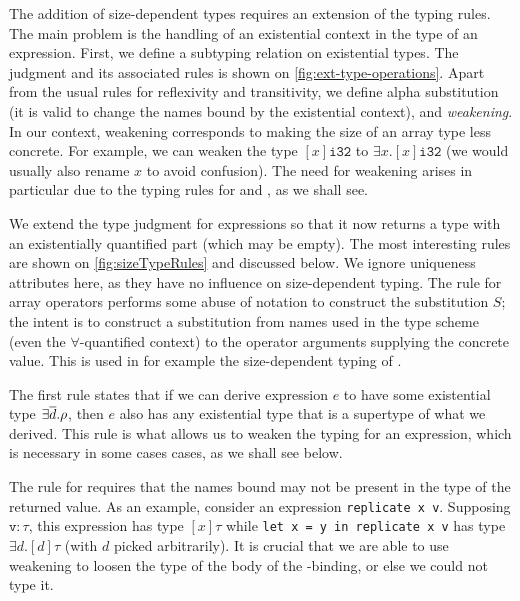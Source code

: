 The addition of size-dependent types requires an extension of the
typing rules.  The main problem is the handling of an existential
context in the type of an expression.  First, we define a subtyping
relation on existential types.  The judgment and its associated rules
is shown on \cref{fig:ext-type-operations}.  Apart from the usual
rules for reflexivity and transitivity, we define alpha substitution
(it is valid to change the names bound by the existential context),
and \textit{weakening}.  In our context, weakening corresponds to
making the size of an array type less concrete.  For example, we can
weaken the type $[x]\texttt{i32}$ to $\exists x.[x]\texttt{i32}$ (we
would usually also rename $x$ to avoid confusion).  The need for
weakening arises in particular due to the typing rules for 
and , as we shall see.

We extend the type judgment for expressions so that it now returns a
type with an existentially quantified part (which may be empty).  The
most interesting rules are shown on \cref{fig:sizeTypeRules} and
discussed below.  We ignore uniqueness attributes here, as they have
no influence on size-dependent typing.  The rule for array operators
performs some abuse of notation to construct the substitution $S$; the
intent is to construct a substitution from names used in the type
scheme (even the $\forall$-quantified context) to the operator
arguments supplying the concrete value.  This is used in for example
the size-dependent typing of .

The first rule states that if we can derive expression $e$ to have
some existential type $\exists\overline{d}.\rho$, then $e$ also has any
existential type that is a supertype of what we derived.  This rule is
what allows us to weaken the typing for an expression, which is
necessary in some cases cases, as we shall see below.

The rule for  requires that the names bound may not be present
in the type of the returned value.  As an example, consider an
expression \lstinline{replicate x v}.  Supposing $\texttt{v}: \tau$,
this expression has type $[x]\tau$ %
while \mbox{\lstinline{let x = y in replicate x v}} has type
$\exists d.[d]\tau$ (with $d$ picked arbitrarily).  It is crucial that
we are able to use weakening to loosen the type of the body of the
-binding, or else we could not type it.

